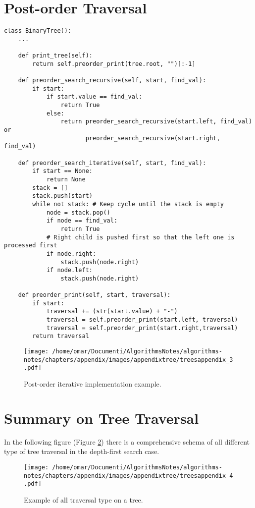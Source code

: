 \section{Post-order Traversal}
\label{postorderappendix}

\begin{lstlisting}[firstnumber=1, caption={Tree operations implementation.}]
class BinaryTree():
	...

	def print_tree(self):
		return self.preorder_print(tree.root, "")[:-1]

	def preorder_search_recursive(self, start, find_val):
		if start:
			if start.value == find_val:
				return True
			else:
				return preorder_search_recursive(start.left, find_val) or
					   preorder_search_recursive(start.right, find_val)

	def preorder_search_iterative(self, start, find_val):
		if start == None:
			return None
		stack = []
		stack.push(start)
		while not stack: # Keep cycle until the stack is empty
			node = stack.pop()
			if node == find_val:
				return True
			# Right child is pushed first so that the left one is processed first
			if node.right:
				stack.push(node.right)
			if node.left:
				stack.push(node.right)

	def preorder_print(self, start, traversal):
		if start:
			traversal += (str(start.value) + "-")
			traversal = self.preorder_print(start.left, traversal)
			traversal = self.preorder_print(start.right,traversal)
		return traversal
\end{lstlisting}

\begin{figure}[H]
	\begin{center}
		\texttt{[image: /home/omar/Documenti/AlgorithmsNotes/algorithms-notes/chapters/appendix/images/appendixtree/treesappendix\_3.pdf]}
		\caption[Post-order iterative implementation example.]{Post-order iterative implementation example.}
		\label{appendixtrees_3}
	\end{center}
\end{figure}

\section{Summary on Tree Traversal}
In the following figure (Figure \ref{appendixtrees_4}) there is a comprehensive schema of all different type of tree traversal in the depth-first search case.

\begin{figure}[H]
	\begin{center}
		\texttt{[image: /home/omar/Documenti/AlgorithmsNotes/algorithms-notes/chapters/appendix/images/appendixtree/treesappendix\_4.pdf]}
		\caption[Example of all traversal type on a tree.]{Example of all traversal type on a tree.}
		\label{appendixtrees_4}
	\end{center}
\end{figure}
